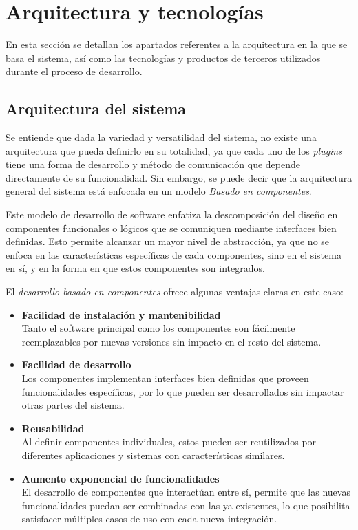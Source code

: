 \section{Arquitectura y tecnologías} \label{sec:arq}

    En esta sección se detallan los apartados referentes a la arquitectura en la que se basa el sistema, así como las tecnologías y productos de terceros utilizados durante el proceso de desarrollo.

    \subsection{Arquitectura del sistema}

        Se entiende que dada la variedad y versatilidad del sistema, no existe una arquitectura que pueda definirlo en su totalidad, ya que cada uno de los \textit{plugins} tiene una forma de desarrollo y método de comunicación que depende directamente de su funcionalidad. Sin embargo, se puede decir que la arquitectura general del sistema está enfocada en un modelo \textit{Basado en componentes}.
        
        Este modelo de desarrollo de software enfatiza la descomposición del diseño en componentes funcionales o lógicos que se comuniquen mediante interfaces bien definidas. Esto permite alcanzar un mayor nivel de abstracción, ya que no se enfoca en las características específicas de cada componentes, sino en el sistema en sí, y en la forma en que estos componentes son integrados.
        
        El \textit{desarrollo basado en componentes} ofrece algunas ventajas claras en este caso:
        \begin{itemize}
            \item \textbf{Facilidad de instalación y mantenibilidad} \\
            Tanto el software principal como los componentes son fácilmente reemplazables por nuevas versiones sin impacto en el resto del sistema.
            
            \item \textbf{Facilidad de desarrollo} \\
            Los componentes implementan interfaces bien definidas que proveen funcionalidades específicas, por lo que pueden ser desarrollados sin impactar otras partes del sistema.
            
            \item \textbf{Reusabilidad} \\
            Al definir componentes individuales, estos pueden ser reutilizados por diferentes aplicaciones y sistemas con características similares.
            
            \item \textbf{Aumento exponencial de funcionalidades} \\
            El desarrollo de componentes que interactúan entre sí, permite que las nuevas funcionalidades puedan ser combinadas con las ya existentes, lo que posibilita satisfacer múltiples casos de uso con cada nueva integración.
        \end{itemize}

